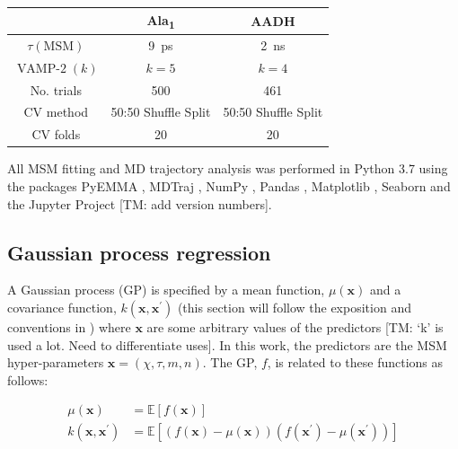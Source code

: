 \begin{table}
    \centering
    \begin{tabular}{|c|c|c|}
    \hline
    & Ala\textsubscript{1} & AADH \\
    \hline\hline
    $\tau(\mathrm{MSM})$ & \SI{9}{\pico\second} & \SI{2}{\nano\second} \\         
    $\operatorname{VAMP-2}(k)$ & $k=5$ & $k=4$ \\
    No. trials & 500 & 461 \\
    CV method & 50:50 Shuffle Split & 50:50 Shuffle Split \\
    CV folds & 20 & 20 \\
     \hline       
    \end{tabular}
    \label{tab:trial_specs}
\end{table}




All MSM fitting and MD trajectory analysis was performed in Python 3.7 using the packages PyEMMA \cite{schererPyEMMASoftwarePackage2015a}, MDTraj \cite{mcgibbonMDTrajModernOpen2015}, NumPy \cite{waltNumPyArrayStructure2011}, Pandas \cite{mckinneyPandasFoundationalPython2011}, Matplotlib \cite{hunterMatplotlib2DGraphics2007},  Seaborn \cite{michaelwaskomMwaskomSeabornV02020} and the Jupyter Project \cite{kluyverJupyterNotebooksPublishing2016} [TM: add version numbers].

\subsection{Gaussian process regression}\label{subsec:gp}

A Gaussian process (GP) is specified by a mean function, $\mu(\mathbf{x})$ and a covariance function, $k(\mathbf{x}, \mathbf{x}^{\prime})$ (this section will follow the exposition and conventions in \cite{rasmussenGaussianProcessesMachine2006}) where $\mathbf{x}$ are some arbitrary values of the predictors [TM: `k' is used a lot. Need to differentiate uses]. In this work, the predictors are the MSM hyper-parameters $\mathbf{x} = (\chi, \tau, m, n)$. The GP, $f$, is related to these functions as follows: 

\begin{equation}
    \begin{aligned}
    \mu\left(\mathbf{x}\right) &=\mathbb{E}\left[f\left(\mathbf{x}\right)\right] \\
    k\left(\mathbf{x}, \mathbf{x}^{\prime}\right) &=\mathbb{E}\left[(f(\mathbf{x})-\mu(\mathbf{x}))\left(f\left(\mathbf{x}^{\prime}\right)-\mu\left(\mathbf{x}^{\prime}\right)\right)\right]
    \end{aligned}
\end{equation}

